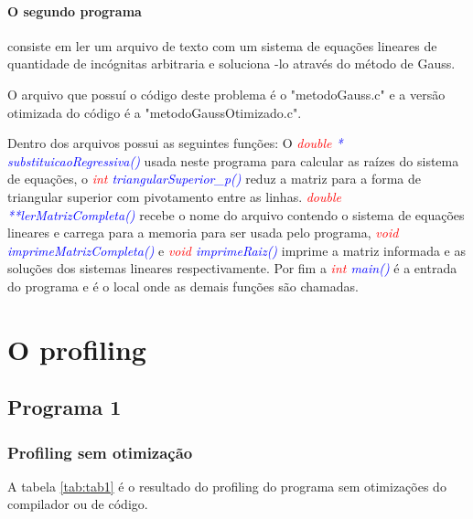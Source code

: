 \documentclass[]{article}
\begin{document}
\paragraph{O segundo programa} consiste em ler um arquivo de texto com um sistema de equações lineares de quantidade de incógnitas arbitraria e soluciona -lo através do método de Gauss.

O arquivo que possuí o código deste problema é o "metodoGauss.c" e a versão otimizada do código é a  "metodoGaussOtimizado.c". 

Dentro dos arquivos possui as seguintes funções: O \textit{\textcolor{red}{double} \textcolor{blue}{* substituicaoRegressiva()}} usada neste programa para calcular as raízes do sistema de equações, o \textit{\textcolor{red}{int} \textcolor{blue}{ triangularSuperior\_p()}} reduz a matriz para a forma de triangular superior com pivotamento entre as linhas. \textit{\textcolor{red}{double} \textcolor{blue}{**lerMatrizCompleta()}} recebe o nome do arquivo contendo o sistema de equações lineares e carrega para a memoria para ser usada pelo programa, \textit{\textcolor{red}{void} \textcolor{blue}{ imprimeMatrizCompleta()}} e \textit{\textcolor{red}{void} \textcolor{blue}{imprimeRaiz()}} imprime a matriz informada e as soluções dos sistemas lineares respectivamente.  Por fim a \textit{\textcolor{red}{int} \textcolor{blue}{main()}} é a entrada do programa e é o local onde as demais funções são chamadas.

\section{O profiling}

\subsection{Programa 1}

\subsubsection{ Profiling sem otimização}

A tabela \ref{tab:tab1} é o resultado do profiling do programa sem otimizações do compilador ou de código.
\end{document}
